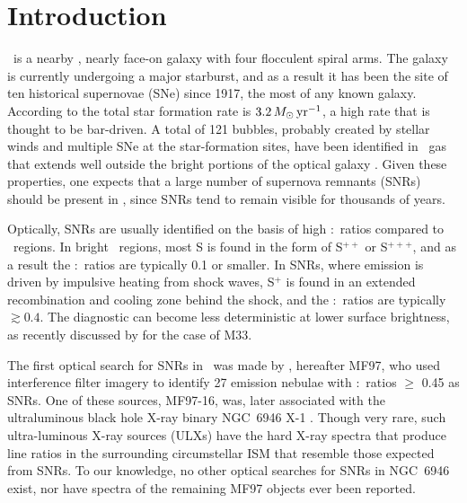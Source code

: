 
\section{Introduction} \label{sec:intro}

\gal\ is a nearby \cite[$6.72\pm 0.15$ Mpc,][]{tikhonov14}, nearly face-on \cite[$i = 32.6\degr$,][]{deblok08} galaxy with four flocculent spiral arms.  The galaxy is currently undergoing a major starburst, and as a result it has been the site of ten historical supernovae (SNe) since 1917, the most of any known galaxy. According to \citet{jarrett13} the total star formation rate is $3.2\, M_\odot\,{\rm yr}^{-1}$, a high rate that is thought to be bar-driven.  A total of 121 bubbles, probably created by stellar winds and multiple SNe at the star-formation sites, have been identified in \hi\ gas that extends well outside the bright portions of the optical galaxy \citep{boomsma08}.  %
Given these properties, one expects that a large number of supernova remnants (SNRs) should be present in \gal, since SNRs tend to remain visible for thousands of years.   

Optically, SNRs are usually identified on the basis of high \sii:\ha\ ratios compared to \hii\ regions.  In bright \hii\ regions, most S is found in the form of S$^{++}$ or S$^{+++}$, and as a result the \sii:\ha\ ratios are typically 0.1 or smaller.  In SNRs, where emission is driven by impulsive heating from shock waves, S$^+$ is found in an extended recombination and cooling zone behind the shock, and the \sii:\ha\ ratios are typically $\gtrsim0.4$.  The diagnostic can become less deterministic at lower surface brightness, as recently discussed by \cite{long18} for the case of M33.

The first optical search for SNRs in \gal\ was made by \cite{matonick97}, hereafter MF97, who used interference filter imagery to identify 27 emission nebulae with \sii:\ha\ ratios $\geq$ 0.45 as SNRs.  One of these sources, MF97-16, was, later associated with the ultraluminous black hole X-ray binary NGC~6946 X-1 \citep{roberts03}. Though very rare, such ultra-luminous X-ray sources (ULXs) have  the hard X-ray spectra that produce line ratios in the surrounding circumstellar ISM that resemble those expected from SNRs. To our knowledge, no other optical searches for SNRs in NGC~6946 exist, nor have spectra of the remaining MF97 objects ever been reported.  

